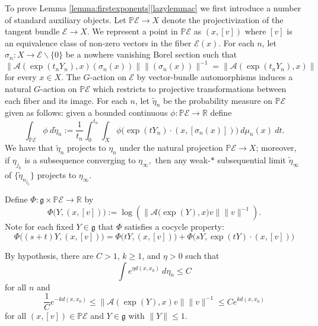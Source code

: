 \documentclass[10pt,reqno]{amsart}
\theoremstyle{Theorem}
\theoremstyle{definition}
\theoremstyle{remark}
\newcommand{\note}[1]{\marginpar{{\color{red}\footnotesize \begin{spacing}{1}#1\end{spacing}}}}
\newcommand{\td}{\tilde}
\newcommand{\sm}{\smallsetminus}
\newcommand{\R}{\mathbb {R}}
\newcommand{\inv}{^{-1}}
\def\calA{\mathcal A}
\def\calE{\mathcal E}
\newcommand{\lieg}{\mathfrak g}
\renewcommand\P{\mathbb{P}}
\def\red{\color{red}}
\def\blue{}
\begin{document}
To prove Lemma \ref{lemma:firstexponents}\ref{lazylemmac} we first introduce a number of {\blue standard} auxiliary objects.
 Let $\P \calE\to X$ denote the projectivization of the  tangent bundle    $\calE\to X$.
 We represent a point in $\P\calE$ as $(x,[v])$ where $[v]$ is an equivalence class of non-zero vectors in the fiber $\calE(x)$.
 For each $n$, let $\sigma_n\colon X\to \calE\sm\{0\}$ be a nowhere vanishing Borel section such that
$$\|\calA (\exp (t_nY_n),x ) (\sigma_n(x))\| \|(\sigma_n(x))\|\inv = \|\calA (\exp (t_nY_n),x)\|$$
for every $x\in X$.
The $G$-action on $\calE$ by vector-bundle automorphisms induces  a natural $G$-action on $\P \calE$ which restricts to projective transformations between each fiber and its image.    For each $n$, let $\td \eta_n$ be the probability measure  on $\P\calE$ given as follows: given a bounded continuous $\phi\colon \P \calE\to \R$ define
$$\int _{\P \calE} \phi  \ d \td \eta_n  :=
\frac{1}{t_n} \int_0^{t_n} \int _X \phi \big(\exp (tY_n) \cdot (x,  [\sigma_n(x)] )\big )\ d \mu_n(x) \ d t.$$%
We have that $\td \eta_n$ projects to $ \eta_n$ under the natural projection $\P\calE\to X$; moreover, if $\eta_{j_k}$ is a subsequence converging to $\eta_\infty,$ then   any weak-$*$ subsequential limit $\td \eta_\infty$ of $\{ \td \eta_{n_{j_k}}\}$   projects to $ \eta_\infty$.


Define  $\Phi\colon \lieg \times \P\calE\to \R$ by  $$\Phi\big(Y,(x, [v])\big) := \log \left(\left\| \calA\big(\exp
(Y), x\big)v\right\|\|v\|\inv\right).$$
Note for each fixed $Y\in \lieg$ that $\Phi$ satisfies a cocycle property:
\begin{equation}\label{eq:cocycle}\Phi\big((s+t)Y,(x, [v])\big)= \Phi\big(tY,(x, [v])\big) +  \Phi\big(sY,\exp(tY)\cdot(x, [v])\big) \end{equation}

By hypothesis, there are $C>1$, $ k\ge 1$, and $\eta>0$ such that $$\int e^{\eta d(x,x_0)} \ d \eta_n \le C$$ for all $n$ and
$$ \frac{1}{C}  e^{-k d(x,x_0)} \le \left \|\calA(\exp (Y),x)v\right\| \|v\|\inv  \le  C  e^{k d(x,x_0)}$$ for all $(x,[v])\in \P\calE$ and $Y\in \lieg$ with $\|Y\|\le 1.$
\end{document}
